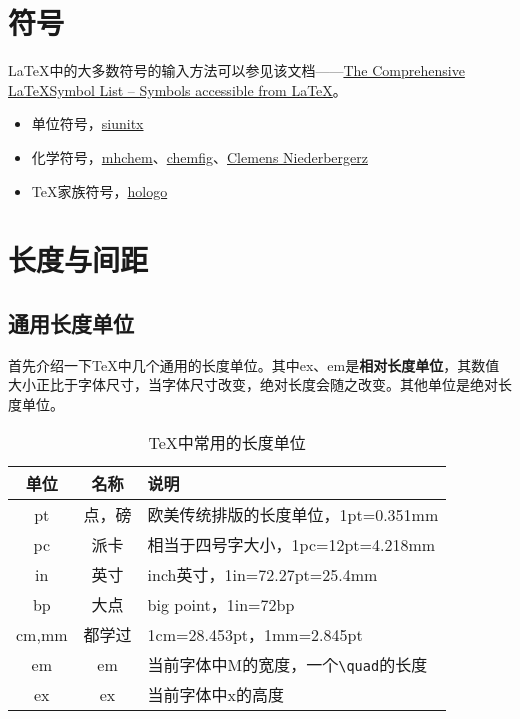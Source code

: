 \section{符号}

\LaTeX{}中的大多数符号的输入方法可以参见该文档——\href{https://www.ctan.org/pkg/comprehensive}{The Comprehensive \LaTeX Symbol List – Symbols accessible from \LaTeX}。

\begin{itemize}[nosep,leftmargin=2em]
    \item 单位符号，\href{https://www.ctan.org/pkg/siunitx}{siunitx}
    \item 化学符号，\href{https://www.ctan.org/pkg/mhchem}{mhchem}、\href{https://www.ctan.org/pkg/chemfig}{chemfig}、\href{https://www.ctan.org/author/niederberger}{Clemens Niederbergerz}
    \item \TeX{}家族符号，\href{https://www.ctan.org/pkg/hologo}{hologo}
\end{itemize}

\section{长度与间距}
\subsection*{通用长度单位}
首先介绍一下\TeX{}中几个通用的长度单位。其中ex、em是\textbf{相对长度单位}，其数值大小正比于字体尺寸，当字体尺寸改变，绝对长度会随之改变。其他单位是绝对长度单位。

\begin{table}[!htb]
    \centering
    \caption{\TeX 中常用的长度单位}
    \label{TeX-length}
    \begin{tabular}{ccl}
        \toprule
        单位 & 名称 & 说明\\
        \midrule
        pt & 点，磅 & 欧美传统排版的长度单位，1pt=0.351mm\\
        pc & 派卡 & 相当于四号字大小，1pc=12pt=4.218mm\\
        in & 英寸 & inch英寸，1in=72.27pt=25.4mm\\
        bp & 大点 & big point，1in=72bp\\
        cm,mm & 都学过 & 1cm=28.453pt，1mm=2.845pt\\
        em & em & 当前字体中M的宽度，一个\lstinline|\quad|的长度\\
        ex & ex & 当前字体中x的高度\\
        \bottomrule
    \end{tabular}
\end{table}

